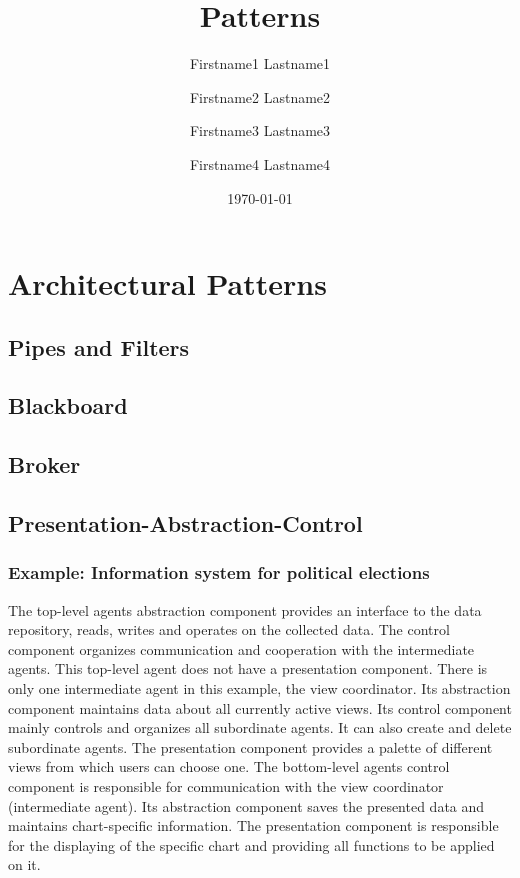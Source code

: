 \documentclass{scrbook}
\title{Patterns}
\author{Firstname1 Lastname1 \and Firstname2 Lastname2 \and Firstname3
Lastname3 \and Firstname4 Lastname4}
\date{\today}
\begin{document}
\frontmatter
\maketitle
\tableofcontents
\mainmatter
\part{Architectural Patterns}
\chapter{Pipes and Filters}
\chapter{Blackboard}
\chapter{Broker}

\chapter{Presentation-Abstraction-Control}

\section{Example: Information system for political elections}	%


The top-level agents abstraction component provides an interface to the data repository, reads, writes and operates on the collected data. The control component organizes communication and cooperation with the intermediate agents. This top-level agent does not have a presentation component. 
There is only one intermediate agent in this example, the view coordinator. Its abstraction component maintains data about all currently active views. Its control component mainly controls and organizes all subordinate agents. It can also create and delete subordinate agents. The presentation component provides a palette of different views from which users can choose one. 
The bottom-level agents control component is responsible for communication with the view coordinator (intermediate agent). Its abstraction component saves the presented data and maintains chart-specific information. The presentation component is responsible for the displaying of the specific chart and providing all functions to be applied on it. 
\end{document}

